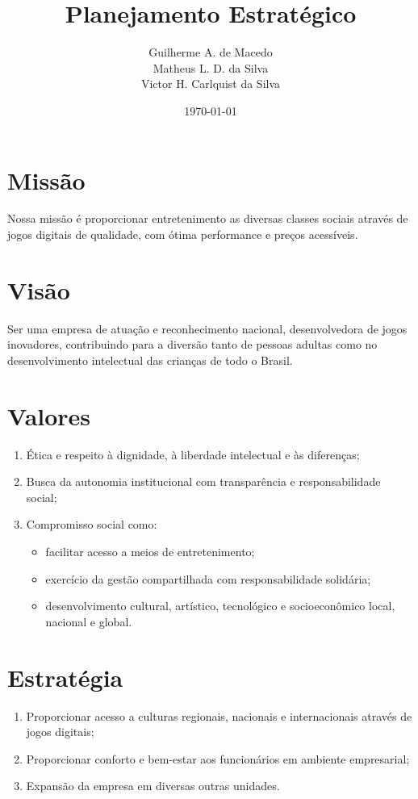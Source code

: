 \documentclass{article}
\author{Guilherme A. de Macedo \\
        Matheus L. D. da Silva \\
        Victor H. Carlquist da Silva
}
\title{ Planejamento Estratégico }
\date{\today}
\begin{document}
	\maketitle

	
        \section{Missão}
        Nossa missão é proporcionar entretenimento as diversas classes sociais através 
        de jogos digitais de qualidade, com ótima performance e preços acessíveis.
    

  
        \section{Visão}
            Ser uma empresa de atuação e reconhecimento nacional, desenvolvedora de 
            jogos inovadores, contribuindo para a diversão tanto de pessoas adultas 
            como no desenvolvimento intelectual das crianças de todo o Brasil.
    
        \section{Valores}
        \begin{enumerate}
            \item Ética e respeito à dignidade, à liberdade intelectual e às diferenças;
            \item Busca da autonomia institucional com transparência e responsabilidade 
                  social;
            \item Compromisso social como:
            \begin{itemize}
                \item facilitar acesso a meios de entretenimento;
                \item exercício da gestão compartilhada com responsabilidade solidária;
                \item desenvolvimento cultural, artístico, tecnológico e socioeconômico
                        local, nacional e global.
            \end{itemize}
        \end{enumerate}
    

  
        \section{Estratégia}
        \begin{enumerate}
            \item Proporcionar acesso a culturas regionais, nacionais e internacionais 
                  através de jogos digitais;
            \item Proporcionar conforto e bem-estar aos funcionários em ambiente empresarial;
            \item Expansão da empresa em diversas outras unidades.
        \end{enumerate}
    
\end{document}

